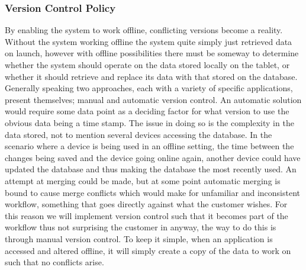 \subsubsection*{Version Control Policy}
By enabling the system to work offline, conflicting versions become a reality.
Without the system working offline the system quite simply just retrieved data on launch, however with offline possibilities there must be someway to determine whether the system should operate on the data stored locally on the tablet, or whether it should retrieve and replace its data with that stored on the database.
Generally speaking two approaches, each with a variety of specific applications, present themselves; manual and automatic version control.
An automatic solution would require some data point as a deciding factor for what version to use the obvious data being a time stamp.
The issue in doing so is the complexity in the data stored, not to mention several devices accessing the database.
In the scenario where a device is being used in an offline setting, the time between the changes being saved and the device going online again, another device could have updated the database and thus making the database the most recently used.
An attempt at merging could be made, but at some point automatic merging is bound to cause merge conflicts which would make for unfamiliar and inconsistent workflow, something that goes directly against what the customer wishes.
For this reason we will implement version control such that it becomes part of the workflow thus not surprising the customer in anyway, the way to do this is through manual version control.
To keep it simple, when an application is accessed and altered offline, it will simply create a copy of the data to work on such that no conflicts arise. 